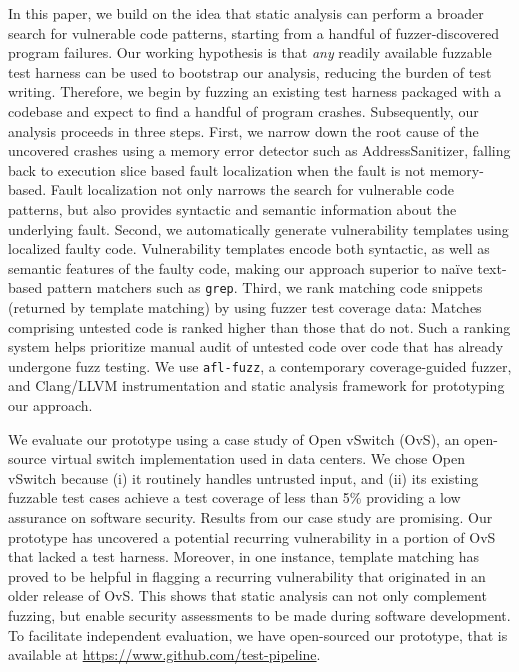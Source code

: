 In this paper, we build on the idea that static analysis can perform a broader search for vulnerable code patterns, starting from a handful of fuzzer-discovered program failures.
Our working hypothesis is that {\it any} readily available fuzzable test harness can be used to bootstrap our analysis, reducing the burden of test writing.
Therefore, we begin by fuzzing an existing test harness packaged with a codebase and expect to find a handful of program crashes.
Subsequently, our analysis proceeds in three steps.
First, we narrow down the root cause of the uncovered crashes using a memory error detector such as AddressSanitizer, falling back to execution slice based fault localization when the fault is not memory-based.
Fault localization not only narrows the search for vulnerable code patterns, but also provides syntactic and semantic information about the underlying fault.
Second, we automatically generate vulnerability templates using localized faulty code.
Vulnerability templates encode both syntactic, as well as semantic features of the faulty code, making our approach superior to na{\"i}ve text-based pattern matchers such as {\tt grep}.
Third, we rank matching code snippets (returned by template matching) by using fuzzer test coverage data: Matches comprising untested code is ranked higher than those that do not.
Such a ranking system helps prioritize manual audit of untested code over code that has already undergone fuzz testing.
We use {\tt afl-fuzz}, a contemporary coverage-guided fuzzer, and Clang/LLVM instrumentation and static analysis framework for prototyping our approach.

We evaluate our prototype using a case study of Open vSwitch (OvS), an open-source virtual switch implementation used in data centers.
We chose Open vSwitch because (i) it routinely handles untrusted input, and (ii) its existing fuzzable test cases achieve a test coverage of less than 5\% providing a low assurance on software security.
Results from our case study are promising.
Our prototype has uncovered a potential recurring vulnerability in a portion of OvS that lacked a test harness.
Moreover, in one instance, template matching has proved to be helpful in flagging a recurring vulnerability that originated in an older release of OvS.
This shows that static analysis can not only complement fuzzing, but enable security assessments to be made during software development.
To facilitate independent evaluation, we have open-sourced our prototype, that is available at \url{https://www.github.com/test-pipeline}.


